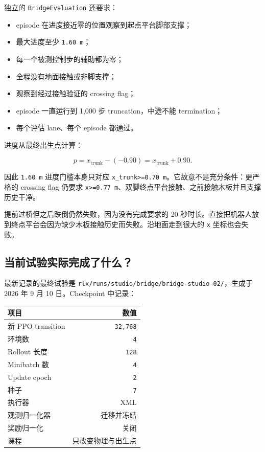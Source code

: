 \documentclass[
  chinese,
  11pt,
  letterpaper,
]{article}
\newcounter{none} %
\providecommand{\tightlist}{%
  \setlength{\itemsep}{0pt}\setlength{\parskip}{0pt}}
\begin{document}
独立的 \texttt{BridgeEv\allowbreak{}aluation\allowbreak{}} 还要求：

\begin{itemize}
\tightlist
\item
  episode 在进度接近零的位置观察到起点平台脚部支撑；
\item
  最大进度至少 \texttt{1.60\ m}；
\item
  每一个被测控制步的辅助都为零；
\item
  全程没有地面接触或非脚支撑；
\item
  观察到经过接触验证的 crossing flag；
\item
  episode 一直运行到 1,000 步 truncation，中途不能 termination；
\item
  每个评估 lane、每个 episode 都通过。
\end{itemize}

进度从最终出生点计算：

\[
p=x_{\text{trunk}}-(-0.90)
=x_{\text{trunk}}+0.90.
\]

因此 \texttt{1.60\ m} 进度门槛本身只对应
\texttt{x\_trunk\textgreater{}=0.70\ m}。它故意不是充分条件：更严格的
crossing flag 仍要求
\texttt{x\textgreater{}=0.77\ m}、双脚终点平台接触、之前接触木板并且支撑历史干净。

提前过桥但之后跌倒仍然失败，因为没有完成要求的 20
秒时长。直接把机器人放到终点平台会因为缺少木板接触历史而失败。沿地面走到很大的
\texttt{x} 坐标也会失败。

\subsection{当前试验实际完成了什么？}\label{ux5f53ux524dux8bd5ux9a8cux5b9eux9645ux5b8cux6210ux4e86ux4ec0ux4e48}

最新记录的最终试验是
\texttt{rlx/\allowbreak{}runs/\allowbreak{}studio/\allowbreak{}bridge/\allowbreak{}bridge-\allowbreak{}studio-\allowbreak{}02/\allowbreak{}}，生成于
2026 年 9 月 10 日。Checkpoint 中记录：

{\def\LTcaptype{none} %
\begin{longtable}[]{@{}lr@{}}
\toprule\noalign{}
项目 & 数值 \\
\midrule\noalign{}
\endhead
\bottomrule\noalign{}
\endlastfoot
新 PPO transition & \texttt{32,768} \\
环境数 & \texttt{4} \\
Rollout 长度 & \texttt{128} \\
Minibatch 数 & \texttt{4} \\
Update epoch & \texttt{2} \\
种子 & \texttt{7} \\
执行器 & XML \\
观测归一化器 & 迁移并冻结 \\
奖励归一化 & 关闭 \\
课程 & 只改变物理与出生点 \\
\end{longtable}
}
\end{document}
